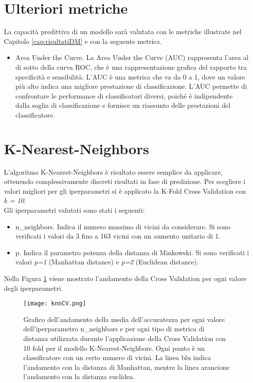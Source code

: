 \section{Ulteriori metriche}
La capacità predittiva di un modello sarà valutata con le metriche illustrate nel Capitolo \ref{cap:risultatiDM} e con la seguente metrica.
\begin{itemize}
	
	\item \textsf{Area Under the Curve}. La Area Under the Curve (AUC) rappresenta l'area al di sotto della curva ROC, che è una rappresentazione grafica del rapporto tra specificità e sensibilità.
	L'AUC è una metrica che va da 0 a 1, dove un valore più alto indica una migliore prestazione di classificazione. L'AUC permette di confrontare le performance di classificatori diversi, poiché è indipendente dalla soglia di classificazione e fornisce un riassunto delle prestazioni del classificatore.
\end{itemize}

\section{K-Nearest-Neighbors}
L'algoritmo K-Nearest-Neighbors è risultato essere semplice da applicare, ottenendo complessivamente discreti risultati in fase di predizione. Per scegliere i valori migliori per gli iperparametri si è applicato la K-Fold Cross Validation con \emph{k = 10}.\\
Gli iperparametri valutati sono stati i seguenti:
\begin{itemize}
	\item \textsf{n\_neighbors}. Indica il numero massimo di vicini da considerare. Si sono verificati i valori da 3 fino a 163 vicini con un aumento unitario di 1.
	\item \textsf{p}. Indica il parametro potenza della distanza di Minkowski. Si sono verificati i valori \emph{p=1} (Manhattan distance) e \emph{p=2} (Euclidean distance).
\end{itemize}

Nella Figura \ref{fig:knnCV} viene mostrato l'andamento della Cross Validation per ogni valore degli iperparametri.
\begin{figure}[h]
	\begin{center}
		\texttt{[image: knnCV.png]}
		\caption{Grafico dell'andamento della media dell'accuratezza per ogni valore dell'iperparametro \textsf{n\_neighbors} e per ogni tipo di metrica di distanza utilizzata durante l'applicazione della Cross Validation con 10 fold per il modello K-Nearest-Neighbors. Ogni punto è un classificatore con un certo numero di vicini. La linea blu indica l'andamento con la distanza di Manhattan, mentre la linea arancione l'andamento con la distanza euclidea.
		} 
		\label{fig:knnCV}
	\end{center}
\end{figure}

